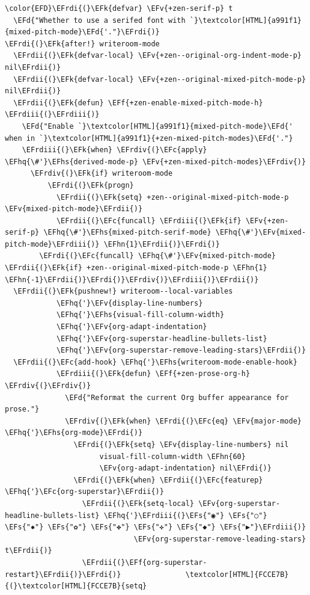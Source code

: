 \documentclass{scrartcl}
\newcommand{\EFk}[1]{\textcolor{EFk}{#1}} %
\newcommand{\EFd}[1]{\textcolor{EFd}{#1}} %
\newcommand{\EFs}[1]{\textcolor{EFs}{#1}} %
\newcommand{\EFc}[1]{\textcolor{EFc}{#1}} %
\newcommand{\EFv}[1]{\textcolor{EFv}{#1}} %
\newcommand{\EFf}[1]{\textcolor{EFf}{#1}} %
\newcommand{\EFhn}[1]{#1} %
\newcommand{\EFhq}[1]{#1} %
\newcommand{\EFhs}[1]{#1} %
\newcommand{\EFrdi}[1]{#1} %
\newcommand{\EFrdii}[1]{#1} %
\newcommand{\EFrdiii}[1]{#1} %
\newcommand{\EFrdiv}[1]{#1} %
\begin{document}
\begin{Code}
\begin{Verbatim}[]
\color{EFD}\EFrdi{(}\EFk{defvar} \EFv{+zen-serif-p} t
  \EFd{"Whether to use a serifed font with `}\textcolor[HTML]{a991f1}{mixed-pitch-mode}\EFd{'."}\EFrdi{)}
\EFrdi{(}\EFk{after!} writeroom-mode
  \EFrdii{(}\EFk{defvar-local} \EFv{+zen--original-org-indent-mode-p} nil\EFrdii{)}
  \EFrdii{(}\EFk{defvar-local} \EFv{+zen--original-mixed-pitch-mode-p} nil\EFrdii{)}
  \EFrdii{(}\EFk{defun} \EFf{+zen-enable-mixed-pitch-mode-h} \EFrdiii{(}\EFrdiii{)}
    \EFd{"Enable `}\textcolor[HTML]{a991f1}{mixed-pitch-mode}\EFd{' when in `}\textcolor[HTML]{a991f1}{+zen-mixed-pitch-modes}\EFd{'."}
    \EFrdiii{(}\EFk{when} \EFrdiv{(}\EFc{apply} \EFhq{\#'}\EFhs{derived-mode-p} \EFv{+zen-mixed-pitch-modes}\EFrdiv{)}
      \EFrdiv{(}\EFk{if} writeroom-mode
          \EFrdi{(}\EFk{progn}
            \EFrdii{(}\EFk{setq} +zen--original-mixed-pitch-mode-p \EFv{mixed-pitch-mode}\EFrdii{)}
            \EFrdii{(}\EFc{funcall} \EFrdiii{(}\EFk{if} \EFv{+zen-serif-p} \EFhq{\#'}\EFhs{mixed-pitch-serif-mode} \EFhq{\#'}\EFv{mixed-pitch-mode}\EFrdiii{)} \EFhn{1}\EFrdii{)}\EFrdi{)}
        \EFrdi{(}\EFc{funcall} \EFhq{\#'}\EFv{mixed-pitch-mode} \EFrdii{(}\EFk{if} +zen--original-mixed-pitch-mode-p \EFhn{1} \EFhn{-1}\EFrdii{)}\EFrdi{)}\EFrdiv{)}\EFrdiii{)}\EFrdii{)}
  \EFrdii{(}\EFk{pushnew!} writeroom--local-variables
            \EFhq{'}\EFv{display-line-numbers}
            \EFhq{'}\EFhs{visual-fill-column-width}
            \EFhq{'}\EFv{org-adapt-indentation}
            \EFhq{'}\EFv{org-superstar-headline-bullets-list}
            \EFhq{'}\EFv{org-superstar-remove-leading-stars}\EFrdii{)}
  \EFrdii{(}\EFc{add-hook} \EFhq{'}\EFhs{writeroom-mode-enable-hook}
            \EFrdiii{(}\EFk{defun} \EFf{+zen-prose-org-h} \EFrdiv{(}\EFrdiv{)}
              \EFd{"Reformat the current Org buffer appearance for prose."}
              \EFrdiv{(}\EFk{when} \EFrdi{(}\EFc{eq} \EFv{major-mode} \EFhq{'}\EFhs{org-mode}\EFrdi{)}
                \EFrdi{(}\EFk{setq} \EFv{display-line-numbers} nil
                      visual-fill-column-width \EFhn{60}
                      \EFv{org-adapt-indentation} nil\EFrdi{)}
                \EFrdi{(}\EFk{when} \EFrdii{(}\EFc{featurep} \EFhq{'}\EFc{org-superstar}\EFrdii{)}
                  \EFrdii{(}\EFk{setq-local} \EFv{org-superstar-headline-bullets-list} \EFhq{'}\EFrdiii{(}\EFs{"◉"} \EFs{"○"} \EFs{"✸"} \EFs{"✿"} \EFs{"✤"} \EFs{"✜"} \EFs{"◆"} \EFs{"▶"}\EFrdiii{)}
                              \EFv{org-superstar-remove-leading-stars} t\EFrdii{)}
                  \EFrdii{(}\EFf{org-superstar-restart}\EFrdii{)}\EFrdi{)}               \textcolor[HTML]{FCCE7B}{(}\textcolor[HTML]{FCCE7B}{setq}

\end{Verbatim}
\end{Code}
\end{document}
